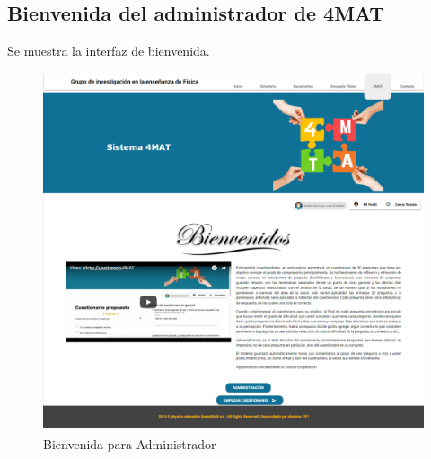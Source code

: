 \subsection{Bienvenida del administrador de 4MAT}

Se muestra la interfaz de bienvenida.
	\begin{figure}[hbtp]
		\centering
		\includegraphics[scale=0.3]{images/Interfaz/IUGS01_binevenida.png}
		\caption{Bienvenida para Administrador}
	\end{figure}
	
